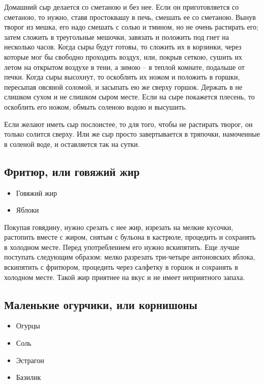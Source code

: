 Домашний сыр делается со сметаною и без нее. Если он приготовляется со сметаною, то нужно, ставя простоквашу в печь, смешать ее со сметаною. Вынув творог из мешка, его надо смешать с солью и тмином, но не очень растирать его; затем сложить в треугольные мешочки, завязать и положить под гнет на несколько часов. Когда сыры будут готовы, то сложить их в корзинки, через которые мог бы свободно проходить воздух, или, покрыв сеткою, сушить их летом на открытом воздухе в тени, а зимою – в теплой комнате, подальше от печки. Когда сыры высохнут, то оскоблить их ножом и положить в горшки, пересыпая овсяной соломой, и засыпать ею же сверху горшок. Держать в не слишком сухом и не слишком сыром месте. Если на сыре покажется плесень, то оскоблить его ножом, обмыть соленою водою и высушить.

Если желают иметь сыр послоистее, то для того, чтобы не растирать творог, он только солится сверху. Или же сыр просто завертывается в тряпочки, намоченные в соленой воде, и оставляется так на сутки.

\subsection{Фритюр, или говяжий жир}

\begin{itemize}
	\item Говяжий жир 
    \item Яблоки
\end{itemize}

Покупая говядину, нужно срезать с нее жир, изрезать на мелкие кусочки, растопить вместе с жиром, снятым с бульона в кастрюле, процедить и сохранять в холодном месте. Перед употреблением его нужно вскипятить. Еще лучше поступать следующим образом: мелко разрезать три-четыре антоновских яблока, вскипятить с фритюром, процедить через салфетку в горшок и сохранять в холодном месте. Такой жир приятнее на вкус и не имеет неприятного запаха.

\subsection{Маленькие огурчики, или корнишоны}

\begin{itemize}
	\item Огурцы
    \item Соль 
    \item Эстрагон
    \item Базилик
\end{itemize}

